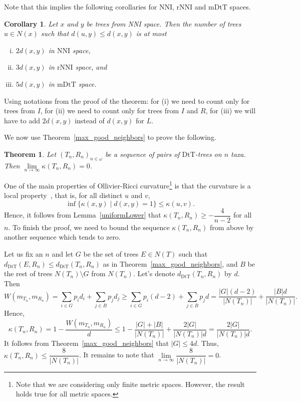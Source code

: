 \documentclass{amsart}
\newtheorem{corollary}[lemma]{Corollary}
\newtheorem{theorem}[lemma]{Theorem}
\newcommand{\dts}{\mathrm{DtT}}
\newcommand{\nni}{\mathrm{NNI}}
\newcommand{\rnni}{\mathrm{rNNI}}
\newcommand{\mdts}{\mathrm{mDtT}}
\begin{document}
Note that this implies the following corollaries for $\nni$, $\rnni$ and $\mdts$ spaces.
\begin{corollary}
Let $x$ and $y$ be trees from NNI space. 
Then the number of trees $u \in N(x)$ such that $d(u, y) \le d(x, y)$ is at most
\begin{enumerate}[(i)]
\item $2d(x,y)$ in $\nni$ space,
\item $3d(x,y)$ in $\rnni$ space, and 
\item $5d(x,y)$ in $\mdts$ space.
\end{enumerate}
\end{corollary}

\proof
Using notations from the proof of the theorem: for (i) we need to count only for trees from $I$, for (ii) we need to count only for trees from $I$ and $R$, for (iii) we will have to add $2d(x,y)$ instead of $d(x,y)$ for $L$.
\endproof

We now use Theorem~\ref{max_good_neighbors} to prove the following. 

\begin{theorem}\label{zero-in-the-limit}
Let $(T_n,R_n)_{n\in\omega}$ be a sequence of pairs of $\dts$-trees on $n$ taxa.
Then $\lim\limits_{n \to \infty}\kappa(T_n,R_n) = 0$.
\end{theorem}

\proof
One of the main properties of Ollivier-Ricci curvature\footnote{Note that we are considering only finite metric spaces. 
However, the result holds true for all metric spaces.} 
is that the curvature is a local property~\cite{Ollivier2009-cj}, that is, for all distinct $u$ and $v$,
\[
\inf\{\kappa(x,y)\mid d(x,y) = 1\} \leq \kappa(u,v).
\]
Hence, it follows from Lemma~\ref{uniformLower} that $\kappa(T_n,R_n) \geq -\dfrac{4}{n-2}$ for all $n$. 
To finish the proof, we need to bound the sequence $\kappa(T_n,R_n)$ from above by another sequence which tends to zero. 

Let us fix an $n$ and let $G$ be the set of trees $E \in N(T)$ such that $d_\dts(E,R_n) \leq d_\dts(T_n,R_n)$ as in Theorem~\ref{max_good_neighbors}, and $B$ be the rest of trees $N(T_n)\setminus G$ from $N(T_n)$. 
Let's denote $d_\dts(T_n,R_n)$ by $d$. Then 
\[
W(m_{T_n},m_{R_n}) = \sum_{i\in G} p_i d_i + \sum_{j\in B} p_j d_j \geq
\sum_{i\in G} p_i (d-2) + \sum_{j\in B} p_j d = 
\frac{|G|(d-2)}{|N(T_n)|} + \frac{|B|d}{|N(T_n)|}.
\]
Hence,
\[
\kappa(T_n,R_n) = 1 - \frac{W(m_{T_n},m_{R_n})}{d} \leq
1 - \frac{|G| + |B|}{|N(T_n)|} + \frac{2|G|}{|N(T_n)|d} 
= \frac{2|G|}{|N(T_n)|d}.
\]
It follows from Theorem~\ref{max_good_neighbors} that $|G| \leq 4d$. 
Thus, $\kappa(T_n,R_n) \leq \dfrac{8}{|N(T_n)|}$. 
It remains to note that $\lim\limits_{n\to\infty}\dfrac{8}{|N(T_n)|} = 0$. 
\endproof
\end{document}
